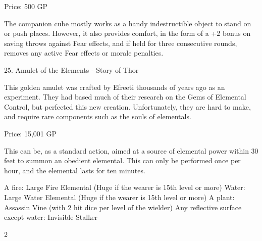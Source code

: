 \begin{multicols}{2}
Price: 500 GP

The companion cube mostly works as a handy indestructible object to stand on or push places. However, it also provides comfort, in the form of a +2 bonus on saving throws against Fear effects, and if held for three consecutive rounds, removes any active Fear effects or morale penalties.


25. Amulet of the Elements - Story of Thor

This golden amulet was crafted by Efreeti thousands of years ago as an experiment. They had based much of their research on the Gems of Elemental Control, but perfected this new creation. Unfortunately, they are hard to make, and require rare components such as the souls of elementals.

Price: 15,001 GP

This can be, as a standard action, aimed at a source of elemental power within 30 feet to summon an obedient elemental. This can only be performed once per hour, and the elemental lasts for ten minutes.

A fire: Large Fire Elemental (Huge if the wearer is 15th level or more)
Water: Large Water Elemental (Huge if the wearer is 15th level or more)
A plant: Assassin Vine (with 2 hit dice per level of the wielder)
Any reflective surface except water: Invisible Stalker
\end{multicols}{2}

